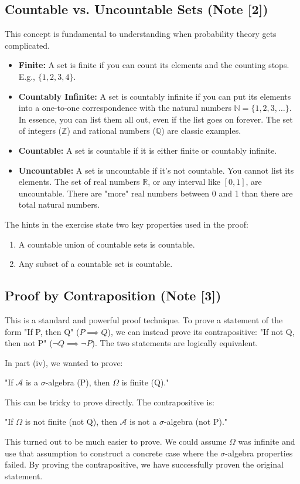 \documentclass[11pt,a4paper]{article}
\begin{document}
\hypertarget{note2}{}%
\subsection{Countable vs. Uncountable Sets (Note [2])}
This concept is fundamental to understanding when probability theory gets complicated.
\begin{itemize}
    \item \textbf{Finite:} A set is finite if you can count its elements and the counting stops. E.g., $\{1,2,3,4\}$.
    \item \textbf{Countably Infinite:} A set is countably infinite if you can put its elements into a one-to-one correspondence with the natural numbers $\mathbb{N} = \{1, 2, 3, \ldots\}$. In essence, you can list them all out, even if the list goes on forever. The set of integers ($\mathbb{Z}$) and rational numbers ($\mathbb{Q}$) are classic examples.
    \item \textbf{Countable:} A set is countable if it is either finite or countably infinite.
    \item \textbf{Uncountable:} A set is uncountable if it's not countable. You cannot list its elements. The set of real numbers $\mathbb{R}$, or any interval like $[0,1]$, are uncountable. There are "more" real numbers between 0 and 1 than there are total natural numbers.
\end{itemize}
The hints in the exercise state two key properties used in the proof:
\begin{enumerate}
    \item A countable union of countable sets is countable.
    \item Any subset of a countable set is countable.
\end{enumerate}

\hypertarget{note3}{}%
\subsection{Proof by Contraposition (Note [3])}
This is a standard and powerful proof technique. To prove a statement of the form "If P, then Q" ($P \implies Q$), we can instead prove its contrapositive: "If not Q, then not P" ($\neg Q \implies \neg P$). The two statements are logically equivalent.

In part (iv), we wanted to prove:
\begin{center}
    "If $\mathcal{A}$ is a $\sigma$-algebra (P), then $\Omega$ is finite (Q)."
\end{center}
This can be tricky to prove directly. The contrapositive is:
\begin{center}
    "If $\Omega$ is not finite (not Q), then $\mathcal{A}$ is not a $\sigma$-algebra (not P)."
\end{center}
This turned out to be much easier to prove. We could assume $\Omega$ was infinite and use that assumption to construct a concrete case where the $\sigma$-algebra properties failed. By proving the contrapositive, we have successfully proven the original statement.
\end{document}
